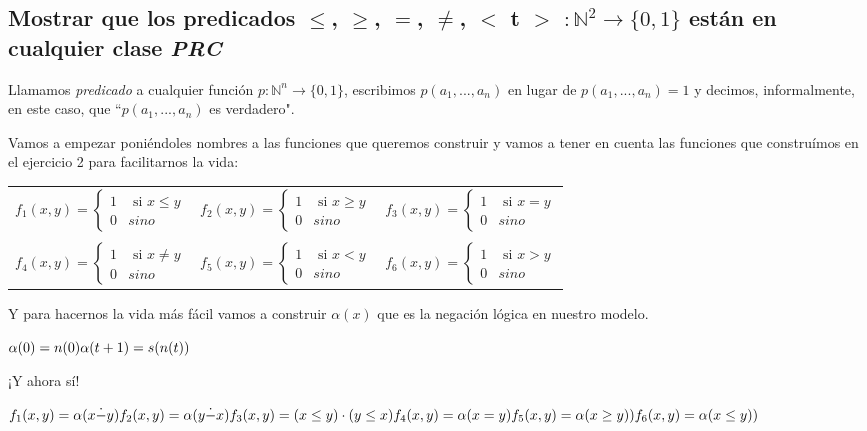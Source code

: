 \documentclass[11pt]{article} %
\newcommand{\desarrollo}[1]{

    \hspace{2em}
    \begin{minipage}{\textwidth}
        #1
    \end{minipage}

}
\newcommand{\nat}{\mathbb{N}}
\begin{document}
\subsection{Mostrar que los predicados $\leq$, $\geq$, $=$, $\neq$, $<$ t $>$ $: \nat^2\to\{0,1\}$ están en cualquier clase \emph{PRC}}

Llamamos \emph{predicado} a cualquier función $p: \nat^n\to\{0,1\}$, escribimos $p(a_1,...,a_n)$ en lugar de $p(a_1,...,a_n)=1$ y decimos, informalmente, en este caso, que ``$p(a_1,...,a_n)$ es verdadero".

Vamos a empezar poniéndoles nombres a las funciones que queremos construir y vamos a tener en cuenta las funciones que construímos en el ejercicio 2 para facilitarnos la vida:

\begin{tabular}{lcr}
$f_1(x,y)=
  \begin{cases}
  1 & \text{ si } x\leq y \\
  0 & sino
  \end{cases}$ &
$f_2(x,y)=
  \begin{cases}
  1 & \text{ si } x\geq y \\
  0 & sino
  \end{cases}$ &
$f_3(x,y)=
  \begin{cases}
  1 & \text{ si } x=y \\
  0 & sino
  \end{cases}$ \\ \\
$f_4(x,y)=
  \begin{cases}
  1 & \text{ si } x\neq y \\
  0 & sino
  \end{cases}$ &
$f_5(x,y)=
  \begin{cases}
  1 & \text{ si } x<y \\
  0 & sino
  \end{cases}$ &
$f_6(x,y)=
  \begin{cases}
  1 & \text{ si } x>y \\
  0 & sino
  \end{cases}$ \\
\end{tabular}

Y para hacernos la vida más fácil vamos a construir $\alpha(x)$ que es la negación lógica en nuestro modelo.
\desarrollo{$
\alpha(0) = n(0) \\
\alpha(t+1) = s(n(t))
$}

¡Y ahora sí!
\desarrollo{$
f_1(x,y)=\alpha(x\dot-y) \\
f_2(x,y)=\alpha(y\dot-x) \\
f_3(x,y)=(x \leq y) \cdot (y \leq x) \\
f_4(x,y)=\alpha(x = y) \\
f_5(x,y)=\alpha(x \geq y)) \\
f_6(x,y)=\alpha(x \leq y))
$}
\end{document}
